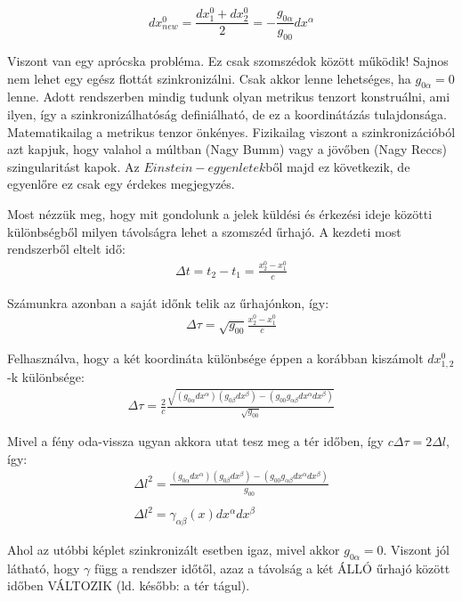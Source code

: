 \documentclass[a4paper,12pt]{article}
\begin{document}
\begin{equation}
    dx^{0}_{new} = \frac{dx_{1}^{0} + dx_2^{0}}{2} = -\frac{g_{0\alpha}}{g_{00}}dx^{\alpha}
\end{equation}
\par Viszont van egy aprócska probléma. Ez csak szomszédok között működik! Sajnos nem lehet egy egész flottát szinkronizálni. Csak akkor lenne lehetséges, ha $g_{0\alpha} = 0$ lenne. Adott rendszerben mindig tudunk olyan metrikus tenzort konstruálni, ami ilyen, így a szinkronizálhatóság definiálható, de ez a koordinátázás tulajdonsága. Matematikailag a metrikus tenzor önkényes. Fizikailag viszont a szinkronizációból azt kapjuk, hogy valahol a múltban (Nagy Bumm) vagy a jövőben  (Nagy Reccs) szingularitást kapok. Az $Einstein-egyenletek$ből majd ez következik, de egyenlőre ez csak egy érdekes megjegyzés.
\par Most nézzük meg, hogy mit gondolunk a jelek küldési és érkezési ideje közötti különbségből milyen távolságra lehet a szomszéd űrhajó. A kezdeti most rendszerből eltelt idő:
\begin{gather*}
    \Delta t = t_{2} - t_{1} = \frac{x^{0}_{2} - x^{0}_{1}}{c}
\end{gather*}
\par Számunkra azonban a saját időnk telik az űrhajónkon, így:
\begin{gather*}
    \Delta \tau = \sqrt{g_{00}}\frac{x^{0}_{2} - x^{0}_{1}}{c}
\end{gather*}
\par Felhasználva, hogy a két koordináta különbsége éppen a korábban kiszámolt $dx_{1,2}^{0}$-k különbsége:
\begin{gather*}
    \Delta \tau = \frac{2}{c}\frac{\sqrt{(g_{0\alpha}dx^{\alpha})(g_{0\beta}dx^{\beta})-(g_{00}g_{\alpha\beta}dx^{\alpha}dx^{\beta})}}{\sqrt{g_{00}}}
\end{gather*}
\par Mivel a fény oda-vissza ugyan akkora utat tesz meg a tér időben, így $c\Delta\tau = 2\Delta l$, így:
\begin{gather*}
    \Delta l^{2} = \frac{(g_{0\alpha}dx^{\alpha})(g_{0\beta}dx^{\beta})-(g_{00}g_{\alpha\beta}dx^{\alpha}dx^{\beta})}{g_{00}} \\ \\
    \Delta l^{2} = \gamma_{\alpha\beta}(x)dx^{\alpha}dx^{\beta}
\end{gather*}
\par Ahol az utóbbi képlet szinkronizált esetben igaz, mivel akkor $g_{0\alpha} = 0$. Viszont jól látható, hogy $\gamma$ függ a rendszer időtől, azaz a távolság a két ÁLLÓ űrhajó között időben VÁLTOZIK (ld. később: a tér tágul).
\end{document}
